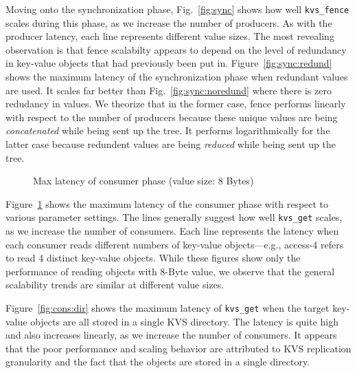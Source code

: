 Moving onto the synchronization phase, Fig.~\ref{fig:sync} shows 
how well {\tt kvs\_fence} scales during this phase,
as we increase the number of producers. 
As with the producer latency,
each line represents different value sizes.  
The most revealing observation is that 
fence scalabilty appears to depend on the level of
redundancy in key-value objects that had previously 
been put in. Figure~\ref{fig:sync:redund} 
shows the maximum latency of the synchronization phase
when redundant values are used. It scales
far better than Fig.~\ref{fig:sync:noredund}
where there is zero redudancy in values. 
We theorize that in the former case, fence performs linearly with respect to the number of
producers because these unique values are being {\em concatenated} while
being sent up the tree. It performs logarithmically for the latter case
because redundent values are being {\em reduced} while being sent 
up the tree. %


\begin{figure}[ht]
\centering
\begin{subfigure}[With single-directory layout]{
  \texttt{[image: consumer-1-dir]}
  \label{fig:cons:dir}
}%
\end{subfigure}
\begin{subfigure}[Improvements with multiple directories]{
  \texttt{[image: consumer-dist-dir]}
  \label{fig:cons:dirs}
}%
\end{subfigure}
\caption{Max latency of consumer phase (value size: 8 Bytes)}
\vspace{-.5cm}
\label{fig:consumer}
\end{figure}

Figure~\ref{fig:consumer} shows the maximum latency of the consumer
phase with respect to various parameter settings. 
The lines generally suggest how well {\tt kvs\_get}
scales, as we increase the number of consumers. Each line represents
the latency when each consumer reads different numbers of 
key-value objects---e.g., access-4 refers to read 4 distinct key-value 
objects. While these figures show only the performance of reading
objects with 8-Byte value, we observe that the general 
scalability trends are similar at different value sizes.

Figure~\ref{fig:cons:dir} shows the maximum latency of {\tt kvs\_get}
when the target key-value objects are all stored in a single
KVS directory. The latency is quite high and also increases
linearly, as we increase the number of consumers. 
It appears that the poor performance and scaling behavior 
are attributed to KVS replication granularity and 
the fact that the objects are stored in a single directory.

